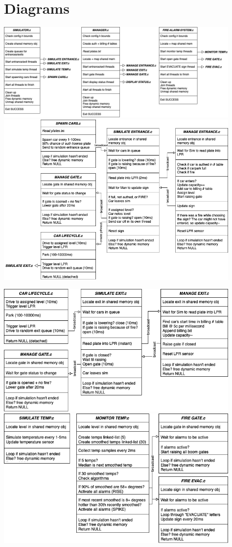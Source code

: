 \documentclass[a4paper]{article}
\begin{document}
\section{Diagrams}
\noindent
\includegraphics[width=12.12cm]{report-img/diagram-mains.png}\\[5\baselineskip]
\noindent
\includegraphics[width=12.12cm]{report-img/diagram-entrance-flow.png}

\newpage
\noindent
\includegraphics[width=12.12cm]{report-img/diagram-exit-flow.png}\\[5\baselineskip]
\noindent
\includegraphics[width=12.12cm]{report-img/diagram-fire-alarm-flow.png}
\end{document}
